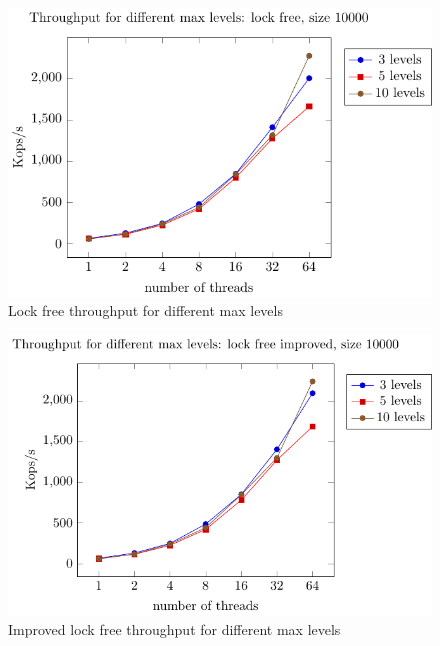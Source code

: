 \documentclass{article}
\begin{document}
\begin{figure}[H]
    \centering
    \includegraphics[width=\textwidth]{plots_for_report/lfree_levels_plot.pdf}
    \caption{Lock free throughput for different max levels}
    \label{fig:lfree_levels}
\end{figure}
\begin{figure}[H]
    \centering
    \includegraphics[width=\textwidth]{plots_for_report/lfree_improved_levels_plot.pdf}
    \caption{Improved lock free throughput for different max levels}
    \label{fig:lfree_improved_levels}
\end{figure}
\end{document}
